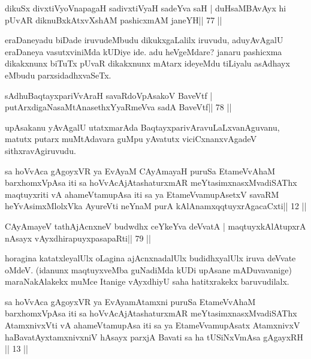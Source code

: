 \begin{shl}
dikuSx divxtiVyoV\s napagaH sadivxtiVyaH sadeYva saH |
duHsaMBAvAyx hi pUvAR diknuBxkAtxvX\s\s shAM pashicxmAM janeYH\hfill || 77 ||
\end{shl}

\begin{artha}
eraDaneyadu biDade iruvudeMbudu dikukxgaLalilx iruvudu, adu\break yAvAgalU eraDaneya vasutxviniMda kUDiye ide. adu heVgeMdare? janaru pashicxma dikakxnunx biTuTx pUvaR dikakxnunx mAtarx ideyeMdu tiLiyalu asAdhayx eMbudu parxsidadhxvaSeTx.
\end{artha}


\begin{shl}
sAdhuBaqtayxpariVvAraH savaRdoVpAsakoV BaveVtf |
putArxdigaNasaMtAnasethxYyaRmeVva sadA BaveVtf\hfill || 78 ||
\end{shl}

\begin{artha}
upAsakanu yAvAgalU utatxmarAda BaqtayxparivAravuLaLxvanAguvanu, matutx putarx muMtAdavara guMpu yAvatutx viciCxnanxvAgadeV sithxravAgiruvudu.
\end{artha} 


\begin{kandikeshl}
sa hoVvAca gAgoyxVR ya EvAyaM CAyAmayaH puruSa EtameVvAhaM barxhomxVpAsa iti sa hoVvAcAjAtashaturxmAR meYtasimxnasxM\-vadiSAThx maqtuyxriti vA ahameVtamupAsa iti sa ya EtameVvamupAsetxV savaRM heYvAsimxMlolxVka AyureVti neYnaM purA kAlAnamxqqtuyxrAgacaCxti|| 12 ||
\end{kandikeshl}


\begin{shl}
CAyAmayeV tathA\s jAcnxneV budwdhx ceYkeYva deVvatA |
maqtuyxkAlAtupxrA nAsayx vAyxdhirapuyxpasapaRti\hfill || 79 ||
\end{shl}

\begin{artha}
horagina katatxleyalUlx oLagina ajAcnxnadalUlx budidhxyalUlx iruva  deVvate oMdeV. (idanunx maqtuyxveMba guNadiMda kUDi upAsane mADuvavanige) maraNakAlakekx muMce Itanige vAyxdhiyU saha hatitxrakekx baruvudilalx.
\end{artha}


\begin{kandikeshl}
sa hoVvAca gAgoyxVR ya EvAyamAtamxni puruSa EtameVvAhaM barxhomxVpAsa iti sa hoVvAcAjAtashaturxmAR meYtasimxnasxMvadiSAThx AtamxnivxVti vA ahameVtamupAsa iti sa ya EtameVvamupAsatx AtamxnivxV ha\break BavatAyxtamxnivxniV hAsayx parxjA Bavati sa ha tUSiNxVmAsa gAgayxRH || 13 ||
\end{kandikeshl}

